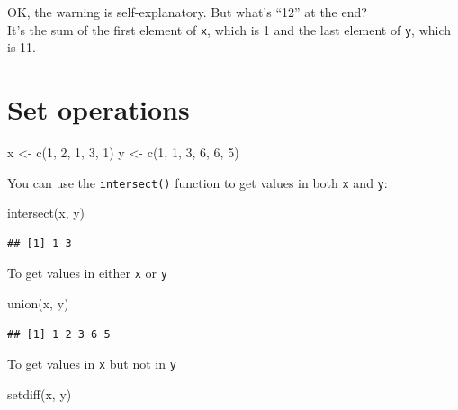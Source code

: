\documentclass[
]{book}
\newenvironment{Shaded}{\begin{snugshade}}{\end{snugshade}}
\newcommand{\DecValTok}[1]{\textcolor[rgb]{0.00,0.00,0.81}{#1}}
\newcommand{\FunctionTok}[1]{\textcolor[rgb]{0.00,0.00,0.00}{#1}}
\newcommand{\NormalTok}[1]{#1}
\newcommand{\OtherTok}[1]{\textcolor[rgb]{0.56,0.35,0.01}{#1}}
\begin{document}
OK, the warning is self-explanatory. But what's ``12'' at the end?\\
It's the sum of the first element of \texttt{x}, which is 1 and the last element of \texttt{y}, which is 11.

\hypertarget{set-operations}{%
\section{Set operations}\label{set-operations}}

\begin{Shaded}
\begin{Highlighting}[]
\NormalTok{x }\OtherTok{\textless{}{-}} \FunctionTok{c}\NormalTok{(}\DecValTok{1}\NormalTok{, }\DecValTok{2}\NormalTok{, }\DecValTok{1}\NormalTok{, }\DecValTok{3}\NormalTok{, }\DecValTok{1}\NormalTok{)}
\NormalTok{y }\OtherTok{\textless{}{-}} \FunctionTok{c}\NormalTok{(}\DecValTok{1}\NormalTok{, }\DecValTok{1}\NormalTok{, }\DecValTok{3}\NormalTok{, }\DecValTok{6}\NormalTok{, }\DecValTok{6}\NormalTok{, }\DecValTok{5}\NormalTok{)}
\end{Highlighting}
\end{Shaded}

You can use the \texttt{intersect()} function to get values in both \texttt{x} and \texttt{y}:

\begin{Shaded}
\begin{Highlighting}[]
\FunctionTok{intersect}\NormalTok{(x, y)}
\end{Highlighting}
\end{Shaded}

\begin{verbatim}
## [1] 1 3
\end{verbatim}

To get values in either \texttt{x} or \texttt{y}

\begin{Shaded}
\begin{Highlighting}[]
\FunctionTok{union}\NormalTok{(x, y)}
\end{Highlighting}
\end{Shaded}

\begin{verbatim}
## [1] 1 2 3 6 5
\end{verbatim}

To get values in \texttt{x} but not in \texttt{y}

\begin{Shaded}
\begin{Highlighting}[]
\FunctionTok{setdiff}\NormalTok{(x, y)}
\end{Highlighting}
\end{Shaded}
\end{document}

